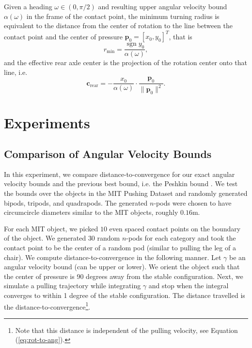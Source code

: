 \documentclass[conference]{IEEEtran}
\DeclareMathOperator{\sign}{\text{sgn}}
\newcommand{\EH}[1]{{\color{blue} {Eric: {#1}}  }}
\begin{document}
Given a heading $\omega \in (0,\pi/2) $ and resulting upper angular
velocity bound $\alpha(\omega)$ in the frame of the contact point, the
minimum turning radius is equivalent to the distance from the center
of rotation to the line between the contact point and the center of
pressure $\mathbf{p}_0 = [x_0,y_0]^T$, that is
\begin{equation}
  r_{\text{min}} = \frac{\sign y_0}{\alpha(\omega)},
\end{equation}
and the effective rear axle center is the projection of the rotation center onto that line, i.e.
\begin{equation}
  \mathbf{c}_{\text{rear}} = -\frac{x_0}{\alpha(\omega)}\cdot\frac{\mathbf{p}_0}{\lVert \mathbf{p}_0 \rVert^2}.
\end{equation}


\section{Experiments}\label{sec:experiments}

\subsection{Comparison of
  Angular Velocity Bounds}\label{sec:bound-comparison}

In this experiment, we compare distance-to-convergence for our exact
angular velocity bounds and the previous best bound, i.e. the Peshkin
bound \cite{peshkin1988motion}. We test the bounds over the objects in
the MIT Pushing Dataset \cite{YuBFR16} and randomly generated bipods,
tripods, and quadrapods. The generated $n$-pods were chosen to have
circumcircle diameters similar to the MIT objects, roughly $0.16$m.


For each MIT object, we picked $10$ even spaced contact points on the
boundary of the object. We generated $30$ random $n$-pods for each
category and took the contact point to be the center of a random pod
(similar to pulling the leg of a chair). We compute
distance-to-convergence in the following manner. Let $\gamma$ be an
angular velocity bound (can be upper or lower). We orient the object
such that the center of pressure is 90 degrees away from the stable
configuration. Next, we simulate a pulling trajectory while
integrating $\gamma$ and stop when the integral converges to within 1
degree of the stable configuration. The distance travelled is the
distance-to-convergence\footnote{Note that this distance is
  independent of the pulling velocity, see Equation
  (\ref{eq:rot-to-ang}).}. 
\end{document}
